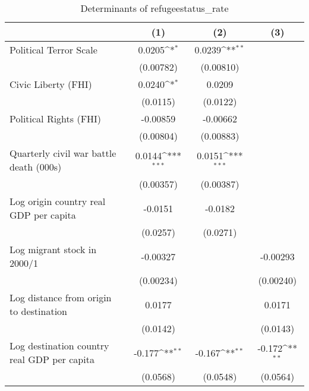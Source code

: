\begin{table}[htbp]\centering
\def\sym#1{\ifmmode^{#1}\else\(^{#1}\)\fi}
\caption{Determinants of refugeestatus\_rate}
\begin{tabular}{l*{3}{c}}
\hline\hline
                    &\multicolumn{1}{c}{(1)}         &\multicolumn{1}{c}{(2)}         &\multicolumn{1}{c}{(3)}         \\
\hline
Political Terror Scale&      0.0205\sym{*}  &      0.0239\sym{**} &                     \\
                    &   (0.00782)         &   (0.00810)         &                     \\
[1em]
Civic Liberty (FHI) &      0.0240\sym{*}  &      0.0209         &                     \\
                    &    (0.0115)         &    (0.0122)         &                     \\
[1em]
Political Rights (FHI)&    -0.00859         &    -0.00662         &                     \\
                    &   (0.00804)         &   (0.00883)         &                     \\
[1em]
Quarterly civil war battle death (000s)&      0.0144\sym{***}&      0.0151\sym{***}&                     \\
                    &   (0.00357)         &   (0.00387)         &                     \\
[1em]
Log origin country real GDP per capita&     -0.0151         &     -0.0182         &                     \\
                    &    (0.0257)         &    (0.0271)         &                     \\
[1em]
Log migrant stock in 2000/1&    -0.00327         &                     &    -0.00293         \\
                    &   (0.00234)         &                     &   (0.00240)         \\
[1em]
Log distance from origin to destination&      0.0177         &                     &      0.0171         \\
                    &    (0.0142)         &                     &    (0.0143)         \\
[1em]
Log destination country real GDP per capita&      -0.177\sym{**} &      -0.167\sym{**} &      -0.172\sym{**} \\
                    &    (0.0568)         &    (0.0548)         &    (0.0564)         \\

\end{tabular}
\end{table}
